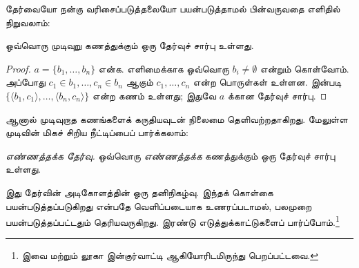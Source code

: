 \documentclass[../../../include/open-logic-section]{subfiles}
\begin{document}

தேர்வையோ நன்கு வரிசைப்படுத்தலையோ பயன்படுத்தாமல்
பின்வருவதை எளிதில் நிறுவலாம்:

\begin{lem}[$\Zminus$ இல்]
ஒவ்வொரு முடிவுறு கணத்துக்கும் ஒரு தேர்வுச் சார்பு உள்ளது.
\end{lem}

\begin{proof}
$a = \{b_1, \ldots, b_n\}$ என்க. எளிமைக்காக ஒவ்வொரு
$b_i \neq \emptyset$ என்றும் கொள்வோம். அப்போது
$c_1 \in b_1, \ldots, c_n \in b_n$ ஆகும்
$c_1, \ldots, c_n$ என்ற பொருள்கள் உள்ளன.
 இன்படி
$\{\langle b_1, c_1\rangle , \ldots, \langle b_n, c_n\rangle\}$
என்ற கணம் உள்ளது; இதுவே $a$ க்கான தேர்வுச் சார்பு.
\end{proof}

ஆனால் முடிவுறாத கணங்களைக் கருதியவுடன் நிலைமை
தெளிவற்றதாகிறது. மேலுள்ள முடிவின் மிகச் சிறிய நீட்டிப்பைப்
பார்க்கலாம்:

\begin{defish}
\emph{எண்ணத்தக்க தேர்வு.} ஒவ்வொரு \emph{எண்ணத்தக்க}
கணத்துக்கும் ஒரு தேர்வுச் சார்பு உள்ளது.
\end{defish}

இது தேர்வின் அடிகோளத்தின் ஒரு தனிநிகழ்வு. இந்தக் கொள்கை
பயன்படுத்தப்படுகிறது என்பதே வெளிப்படையாக உணரப்படாமல்,
பலமுறை பயன்படுத்தப்பட்டதும் தெரியவருகிறது. இரண்டு
எடுத்துக்காட்டுகளைப் பார்ப்போம்.\footnote{இவை
\citet[\S9.4]{Potter2004} மற்றும் லூகா இன்குர்வாட்டி
ஆகியோரிடமிருந்து பெறப்பட்டவை.}
\end{document}
